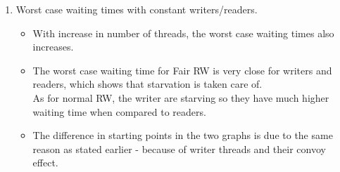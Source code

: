 \documentclass[12pt]{article}
\begin{document}
\begin{enumerate}
\begin{itemize}
	\end{itemize}
	\item Worst case waiting times with constant writers/readers.
	\begin{itemize}
	\item With increase in number of threads, the worst case waiting times also increases.
	\item The worst case waiting time for Fair RW is very close for writers and readers, which shows that starvation is taken care of.\\
	As for normal RW, the writer are starving so they have much higher waiting time when compared to readers.
	\item The difference in starting points in the two graphs is due to the same reason as stated earlier - because of writer threads and their convoy effect.
	\end{itemize}
\end{enumerate}
\end{document}
